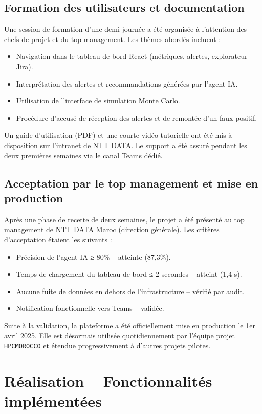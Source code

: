\subsection{Formation des utilisateurs et documentation}
Une session de formation d’une demi-journée a été organisée à l’attention des chefs de projet et du top management. Les thèmes abordés incluent :
\begin{itemize}
    \renewcommand{\labelitemi}{—}
    \item Navigation dans le tableau de bord React (métriques, alertes, explorateur Jira).
    \item Interprétation des alertes et recommandations générées par l’agent IA.
    \item Utilisation de l’interface de simulation Monte Carlo.
    \item Procédure d’accusé de réception des alertes et de remontée d’un faux positif.
\end{itemize}
Un guide d’utilisation (PDF) et une courte vidéo tutorielle ont été mis à disposition sur l’intranet de NTT DATA. Le support a été assuré pendant les deux premières semaines via le canal Teams dédié.

\subsection{Acceptation par le top management et mise en production}
Après une phase de recette de deux semaines, le projet a été présenté au top management de NTT DATA Maroc (direction générale). Les critères d’acceptation étaient les suivants :
\begin{itemize}
    \renewcommand{\labelitemi}{—}
    \item Précision de l’agent IA ≥ 80\% – atteinte (87,3\%).
    \item Temps de chargement du tableau de bord ≤ 2 secondes – atteint (1,4 s).
    \item Aucune fuite de données en dehors de l’infrastructure – vérifié par audit.
    \item Notification fonctionnelle vers Teams – validée.
\end{itemize}
Suite à la validation, la plateforme a été officiellement mise en production le 1er avril 2025. Elle est désormais utilisée quotidiennement par l’équipe projet \texttt{HPCMOROCCO} et étendue progressivement à d’autres projets pilotes.


\section{Réalisation – Fonctionnalités implémentées}

